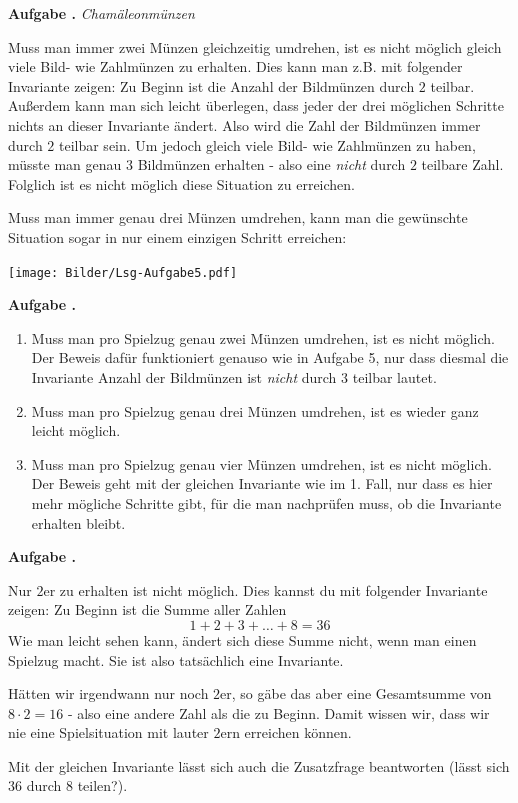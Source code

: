 \documentclass[a4paper,ngerman,12pt]{scrartcl}
\theoremstyle{definition}
\theoremstyle{plain}
\theoremstyle{remark}
\newlength{\aufgabenskip}
\newcounter{aufgabennummer}
\newenvironment{aufgabe}[1]{
	\addtocounter{aufgabennummer}{1}
	\textbf{Aufgabe \theaufgabennummer.} \emph{#1} \par
}{\vspace{\aufgabenskip}}
\begin{document}
\newpage
\begin{aufgabe}{Chamäleonmünzen}
	Muss man immer zwei Münzen gleichzeitig umdrehen, ist es nicht möglich gleich viele Bild- wie Zahlmünzen zu erhalten. Dies kann man z.B. mit folgender Invariante zeigen: Zu Beginn ist die Anzahl der Bildmünzen durch $2$ teilbar. Außerdem kann man sich leicht überlegen, dass jeder der drei möglichen Schritte nichts an dieser Invariante ändert. Also wird die Zahl der Bildmünzen immer durch $2$ teilbar sein. Um jedoch gleich viele Bild- wie Zahlmünzen zu haben, müsste man genau $3$ Bildmünzen erhalten - also eine \emph{nicht} durch $2$ teilbare Zahl. Folglich ist es nicht möglich diese Situation zu erreichen.
	
	Muss man immer genau drei Münzen umdrehen, kann man die gewünschte Situation sogar in nur einem einzigen Schritt erreichen:
	\begin{center}
		\texttt{[image: Bilder/Lsg-Aufgabe5.pdf]}
	\end{center}		
\end{aufgabe}

\begin{aufgabe}{}
	\begin{enumerate}
		\item Muss man pro Spielzug genau zwei Münzen umdrehen, ist es nicht möglich. Der Beweis dafür funktioniert genauso wie in Aufgabe 5, nur dass diesmal die Invariante \glqq Anzahl der Bildmünzen ist \emph{nicht} durch $3$ teilbar\grqq{} lautet.
		\item Muss man pro Spielzug genau drei Münzen umdrehen, ist es wieder ganz leicht möglich.
		\item Muss man pro Spielzug genau vier Münzen umdrehen, ist es nicht möglich. Der Beweis geht mit der gleichen Invariante wie im 1. Fall, nur dass es hier mehr mögliche Schritte gibt, für die man nachprüfen muss, ob die Invariante erhalten bleibt.
	\end{enumerate}
\end{aufgabe}

\begin{aufgabe}{}
Nur $2$er zu erhalten ist nicht möglich. Dies kannst du mit folgender Invariante zeigen: Zu Beginn ist die Summe aller Zahlen 
\[1+2+3+ \dots + 8 = 36\]
Wie man leicht sehen kann, ändert sich diese Summe nicht, wenn man einen Spielzug macht. Sie ist also tatsächlich eine Invariante.

Hätten wir irgendwann nur noch $2$er, so gäbe das aber eine Gesamtsumme von $8\cdot 2 = 16$ - also eine andere Zahl als die zu Beginn. Damit wissen wir, dass wir nie eine Spielsituation mit lauter $2$ern erreichen können.

Mit der gleichen Invariante lässt sich auch die Zusatzfrage beantworten (lässt sich $36$ durch $8$ teilen?).

\end{aufgabe}
\end{document}
